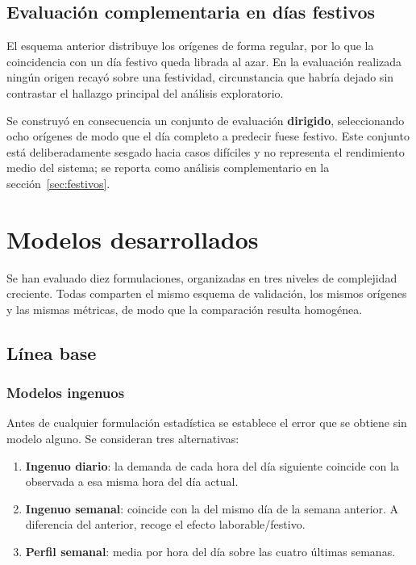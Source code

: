 \subsection*{Evaluación complementaria en días festivos}

El esquema anterior distribuye los orígenes de forma regular, por lo que la
coincidencia con un día festivo queda librada al azar. En la evaluación realizada
ningún origen recayó sobre una festividad, circunstancia que habría dejado sin
contrastar el hallazgo principal del análisis exploratorio.

Se construyó en consecuencia un conjunto de evaluación \textbf{dirigido},
seleccionando ocho orígenes de modo que el día completo a predecir fuese festivo.
Este conjunto está deliberadamente sesgado hacia casos difíciles y no representa
el rendimiento medio del sistema; se reporta como análisis complementario en la
sección~\ref{sec:festivos}.



\section{Modelos desarrollados}

Se han evaluado diez formulaciones, organizadas en tres niveles de complejidad
creciente. Todas comparten el mismo esquema de validación, los mismos orígenes y
las mismas métricas, de modo que la comparación resulta homogénea.

\subsection{Línea base}

\subsubsection*{Modelos ingenuos}

Antes de cualquier formulación estadística se establece el error que se obtiene
sin modelo alguno. Se consideran tres alternativas:

\begin{enumerate}
  \item \textbf{Ingenuo diario}: la demanda de cada hora del día siguiente
        coincide con la observada a esa misma hora del día actual.
  \item \textbf{Ingenuo semanal}: coincide con la del mismo día de la semana
        anterior. A diferencia del anterior, recoge el efecto laborable/festivo.
  \item \textbf{Perfil semanal}: media por hora del día sobre las cuatro últimas
        semanas.
\end{enumerate}

